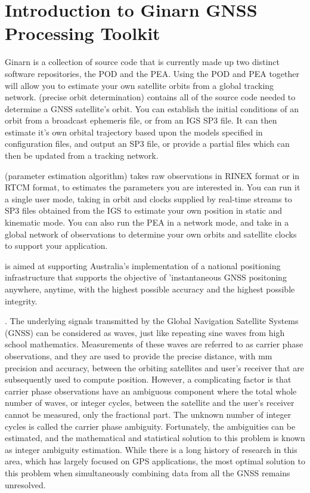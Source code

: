 \chapter{Introduction to Ginarn GNSS Processing Toolkit}
\label{ch:introduction}
%


Ginarn is a collection of source code that is currently made up two distinct software repositories, the POD  and the PEA.
Using the POD and PEA together will allow you to estimate your own satellite orbits from a global tracking network.
 (precise orbit determination) contains all of the source code needed to determine a GNSS satellite's orbit. You can establish the initial conditions of an orbit from a broadcast ephemeris file, or from an IGS SP3 file. It can then estimate it's own orbital trajectory based upon the models specified in configuration files, and output an SP3 file, or provide a partial files which can then be updated from a tracking network. 



 (parameter estimation algorithm) takes raw observations in RINEX format or in RTCM format, to estimates the parameters you are interested in. You can run it a single user mode, taking in orbit and clocks supplied by real-time streams to SP3 files obtained from the IGS to estimate your own position in static and kinematic mode. 
You can also run the PEA in a network mode, and take in a global network of observations to determine your own orbits and satellite clocks to support your application.

 is aimed at supporting Australia's implementation of a national positioning infrastructure that supports the objective of 'instantaneous GNSS positoning anywhere, anytime, with the highest possible accuracy and the highest possible integrity.

. The underlying signals transmitted by the Global Navigation Satellite Systems (GNSS) can be considered as waves, just like repeating sine waves from high school mathematics. Measurements of these waves are referred to as carrier phase observations, and they are used to provide the precise distance, with mm precision and accuracy, between the orbiting satellites and user’s receiver that are subsequently used to compute position. However, a complicating factor is that carrier phase observations have an ambiguous component where the total whole number of waves, or integer cycles, between the satellite and the user’s receiver cannot be measured, only the fractional part. The unknown number of integer cycles is called the carrier phase ambiguity. Fortunately, the ambiguities can be estimated, and the mathematical and statistical solution to this problem is known as integer ambiguity estimation. While there is a long history of research in this area, which has largely focused on GPS applications, the most optimal solution to this problem when simultaneously combining data from all the GNSS remains unresolved.

